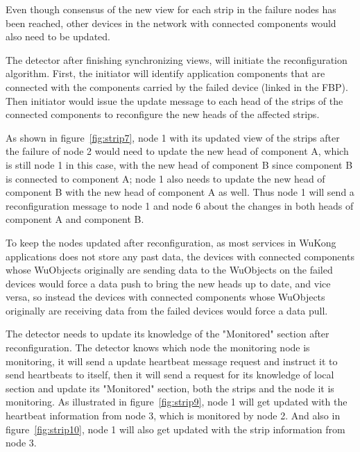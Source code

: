 Even though consensus of the new view for each strip in the failure nodes has been
reached, other devices in the network with connected components would also need
to be updated. 

The detector after finishing synchronizing views, will initiate
the reconfiguration algorithm. First, the initiator will identify application components
that are connected with the components carried by the failed device (linked in the
FBP). Then initiator would issue the update message to each head of the strips of the connected components
to reconfigure the new heads of the affected strips.

As shown in figure~\ref{fig:strip7}, node 1 with its updated view of the strips
after the failure of node 2 would need to update the new head of component A,
which is still node 1 in this case, with the new head of component B since
component B is connected to component A; node 1 also needs to update the new
head of component B with the new head of component A as well. Thus node 1 will
send a reconfiguration message to node 1 and node 6 about the changes in both
heads of component A and component B.

To keep the nodes updated after reconfiguration, as most services in WuKong
applications does not store any past data, the devices with connected components whose WuObjects
originally are sending data to the WuObjects on the failed devices would force a data push to
bring the new heads up to date, and vice versa, so instead the devices with
connected components whose WuObjects originally are receiving data from the
failed devices would force a data pull.

The detector needs to update its knowledge of the "Monitored" section after
reconfiguration. The detector knows which node the monitoring node is
monitoring, it will send a update heartbeat message request and instruct it to
send heartbeats to itself, then it will send a request for its knowledge of
local section and update its "Monitored" section, both the strips and the node
it is monitoring. As illustrated in figure~\ref{fig:strip9}, node 1 will get
updated with the heartbeat information from node 3, which is monitored by node
2. And also in figure~\ref{fig:strip10}, node 1 will also get updated with the strip
information from node 3.


